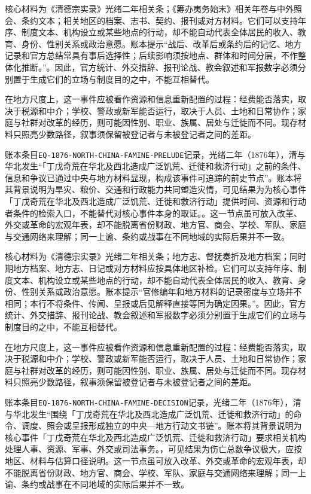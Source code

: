 核心材料为《清德宗实录》光绪二年相关条；《筹办夷务始末》相关年卷与中外照会、条约文本；相关地区的档案、志书、契约、报刊或对方材料。它们可以支持年序、制度文本、机构设立或某些地点的行动，却不能自动代表全体居民的收入、教育、身份、性别关系或政治意愿。账本提示“战后、改革后或条约后的记忆、地方记录和官方总结常具有事后选择性；后续影响须按地点、群体和时间分层，不作整体化推断。”。因此，官方统计、外交措辞、报刊论战、教会叙述和军报数字必须分别置于生成它们的立场与制度目的之中，不能互相替代。

在地方尺度上，这一事件应被看作资源和信息重新配置的过程：经费能否落实，取决于税源和中介；学校、警政或新军能否运行，取决于人员、土地和日常协作；家庭与社群对改革的经历，则可能因性别、职业、族属、居处与迁徙而不同。现存材料只照亮少数路径，叙事须保留被登记者与未被登记者之间的差距。

账本条目\texttt{EQ-1876-NORTH-CHINA-FAMINE-PRELUDE}记录，光绪二年（1876年），清与华北发生“「丁戊奇荒在华北及西北造成广泛饥荒、迁徙和救济行动」之前的条件、信息和争议已通过中央与地方材料显现，构成该事件可追踪的前史节点”。账本将其背景说明为旱灾、粮价、交通和行政能力共同塑造灾情，可见结果为为核心事件「丁戊奇荒在华北及西北造成广泛饥荒、迁徙和救济行动」提供时间、资源和行动者条件的检索入口，不能替代对核心事件本身的取证。。这一节点虽可放入改革、外交或革命的宏观年表，却不能脱离省份财政、地方官、商会、学校、军队、家庭与交通网络来理解；同一上谕、条约或战事在不同地域的实际后果并不一致。

核心材料为《清德宗实录》光绪二年相关条；地方志、督抚奏折及地方档案；同时期地方档案、地方志、日记或对方材料应按具体地区补检。它们可以支持年序、制度文本、机构设立或某些地点的行动，却不能自动代表全体居民的收入、教育、身份、性别关系或政治意愿。账本提示“官修编年和地方材料的记录密度与立场并不相同；本行不将条件、传闻、呈报或后见解释直接等同为确定因果。”。因此，官方统计、外交措辞、报刊论战、教会叙述和军报数字必须分别置于生成它们的立场与制度目的之中，不能互相替代。

在地方尺度上，这一事件应被看作资源和信息重新配置的过程：经费能否落实，取决于税源和中介；学校、警政或新军能否运行，取决于人员、土地和日常协作；家庭与社群对改革的经历，则可能因性别、职业、族属、居处与迁徙而不同。现存材料只照亮少数路径，叙事须保留被登记者与未被登记者之间的差距。

账本条目\texttt{EQ-1876-NORTH-CHINA-FAMINE-DECISION}记录，光绪二年（1876年），清与华北发生“围绕「丁戊奇荒在华北及西北造成广泛饥荒、迁徙和救济行动」的命令、调度、照会或呈报形成独立的中央—地方行动文书链”。账本将其背景说明为核心事件「丁戊奇荒在华北及西北造成广泛饥荒、迁徙和救济行动」要求相关机构处理人事、资源、军事、外交或司法事务。，可见结果为伤亡总数争议极大，应按地区、材料与估算口径说明。这一节点虽可放入改革、外交或革命的宏观年表，却不能脱离省份财政、地方官、商会、学校、军队、家庭与交通网络来理解；同一上谕、条约或战事在不同地域的实际后果并不一致。

